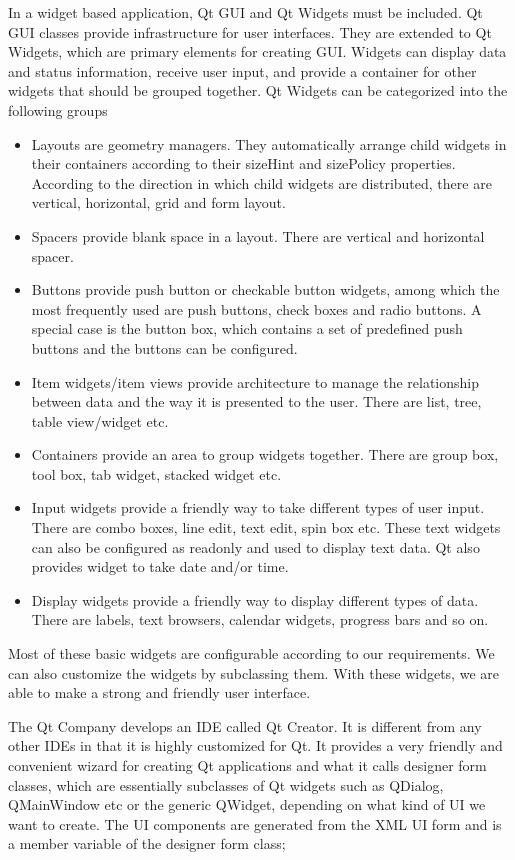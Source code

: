 In a widget based application, Qt GUI and Qt Widgets must be included. Qt GUI classes provide infrastructure for user interfaces. They are extended to Qt Widgets, which are primary elements for creating GUI. Widgets can display data and status information, receive user input, and provide a container for other widgets that should be grouped together. Qt Widgets can be categorized into the following groups
\begin{itemize}
\item Layouts are geometry managers. They automatically arrange child widgets in their containers according to their sizeHint and sizePolicy properties. According to the direction in which child widgets are distributed, there are vertical, horizontal, grid and form layout.
\item Spacers provide blank space in a layout. There are vertical and horizontal spacer.
\item Buttons provide push button or checkable button widgets, among which the most frequently used are push buttons, check boxes and radio buttons. A special case is the button box, which contains a set of predefined push buttons and the buttons can be configured.
\item Item widgets/item views provide architecture to manage the relationship between data and the way it is presented to the user. There are list, tree, table view/widget etc.
\item Containers provide an area to group widgets together. There are group box, tool box, tab widget, stacked widget etc.
\item Input widgets provide a friendly way to take different types of user input. There are combo boxes, line edit, text edit, spin box etc. These text widgets can also be configured as readonly and used to display text data. Qt also provides widget to take date and/or time.
\item Display widgets provide a friendly way to display different types of data. There are labels, text browsers, calendar widgets, progress bars and so on.
\end{itemize}

Most of these basic widgets are configurable according to our requirements. We can also customize the widgets by subclassing them. With these widgets, we are able to make a strong and friendly user interface.

The Qt Company develops an IDE called Qt Creator. It is different from any other IDEs in that it is highly customized for Qt. It provides a very friendly and convenient wizard for creating Qt applications and what it calls designer form classes, which are essentially subclasses of Qt widgets such as QDialog, QMainWindow etc or the generic QWidget, depending on what kind of UI we want to create. The UI components are generated from the XML UI form and is a member variable of the designer form class;

